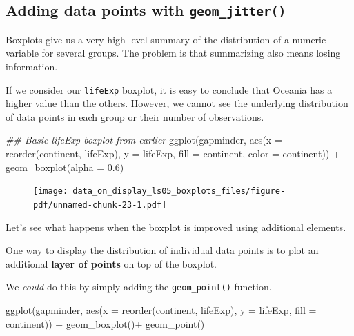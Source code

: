 \documentclass[
  letterpaper,
  DIV=11,
  numbers=noendperiod]{scrreprt}
\newenvironment{Shaded}{\begin{snugshade}}{\end{snugshade}}
\newcommand{\AttributeTok}[1]{\textcolor[rgb]{0.40,0.45,0.13}{#1}}
\newcommand{\DocumentationTok}[1]{\textcolor[rgb]{0.37,0.37,0.37}{\textit{#1}}}
\newcommand{\FloatTok}[1]{\textcolor[rgb]{0.68,0.00,0.00}{#1}}
\newcommand{\FunctionTok}[1]{\textcolor[rgb]{0.28,0.35,0.67}{#1}}
\newcommand{\NormalTok}[1]{\textcolor[rgb]{0.00,0.23,0.31}{#1}}
\newcommand{\SpecialCharTok}[1]{\textcolor[rgb]{0.37,0.37,0.37}{#1}}
\begin{document}
\hypertarget{adding-data-points-with-geom_jitter}{%
\subsection{\texorpdfstring{Adding data points with
\texttt{geom\_jitter()}}{Adding data points with geom\_jitter()}}\label{adding-data-points-with-geom_jitter}}

Boxplots give us a very high-level summary of the distribution of a
numeric variable for several groups. The problem is that summarizing
also means losing information.

If we consider our \texttt{lifeExp} boxplot, it is easy to conclude that
Oceania has a higher value than the others. However, we cannot see the
underlying distribution of data points in each group or their number of
observations.

\begin{Shaded}
\begin{Highlighting}[]
\DocumentationTok{\#\# Basic lifeExp boxplot from earlier}
\FunctionTok{ggplot}\NormalTok{(gapminder, }
       \FunctionTok{aes}\NormalTok{(}\AttributeTok{x =} \FunctionTok{reorder}\NormalTok{(continent, lifeExp),}
           \AttributeTok{y =}\NormalTok{ lifeExp, }
           \AttributeTok{fill =}\NormalTok{ continent,}
           \AttributeTok{color =}\NormalTok{ continent)) }\SpecialCharTok{+}
  \FunctionTok{geom\_boxplot}\NormalTok{(}\AttributeTok{alpha =} \FloatTok{0.6}\NormalTok{)}
\end{Highlighting}
\end{Shaded}

\begin{figure}[H]

{\centering \texttt{[image: data\_on\_display\_ls05\_boxplots\_files/figure-pdf/unnamed-chunk-23-1.pdf]}

}

\end{figure}

Let's see what happens when the boxplot is improved using additional
elements.

One way to display the distribution of individual data points is to plot
an additional \textbf{layer of points} on top of the boxplot.

We \emph{could} do this by simply adding the \texttt{geom\_point()}
function.

\begin{Shaded}
\begin{Highlighting}[]
\FunctionTok{ggplot}\NormalTok{(gapminder, }
       \FunctionTok{aes}\NormalTok{(}\AttributeTok{x =} \FunctionTok{reorder}\NormalTok{(continent, lifeExp), }
           \AttributeTok{y =}\NormalTok{ lifeExp,}
           \AttributeTok{fill =}\NormalTok{ continent)) }\SpecialCharTok{+}
      \FunctionTok{geom\_boxplot}\NormalTok{()}\SpecialCharTok{+}
      \FunctionTok{geom\_point}\NormalTok{()}
\end{Highlighting}
\end{Shaded}
\end{document}

